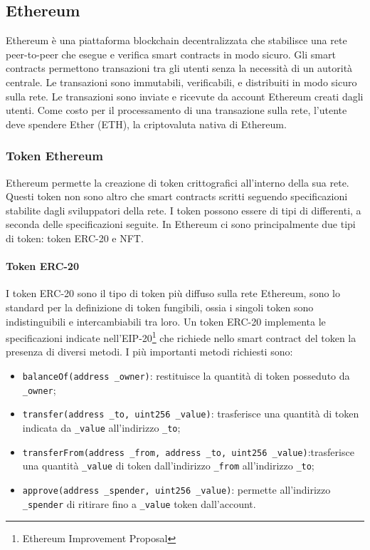 \documentclass[a4paper]{article}
\begin{document}
    \subsection{Ethereum}
    Ethereum è una piattaforma blockchain decentralizzata che stabilisce una rete peer-to-peer che esegue e verifica smart contracts in modo sicuro.
    Gli smart contracts permettono transazioni tra gli utenti senza la necessità di un autorità centrale.
    Le transazioni sono immutabili, verificabili, e distribuiti in modo sicuro sulla rete. Le transazioni sono inviate e ricevute da account Ethereum creati dagli utenti.
    Come costo per il processamento di una transazione sulla rete, l'utente deve spendere Ether (ETH), la criptovaluta nativa di Ethereum\cite{ethereum}.
    \subsubsection{Token Ethereum}
    Ethereum permette la creazione di token crittografici all'interno della sua rete. Questi token non sono altro che smart contracts scritti seguendo specificazioni stabilite
    dagli sviluppatori della rete. I token possono essere di tipi di differenti, a seconda delle specificazioni seguite. In Ethereum ci sono principalmente due tipi di token: token ERC-20 e NFT.
    \paragraph{Token ERC-20}
    I token ERC-20 sono il tipo di token più diffuso sulla rete Ethereum, sono lo standard per la definizione di token fungibili\cite{erc20}, ossia i singoli token sono indistinguibili e intercambiabili tra loro.
    Un token ERC-20 implementa le specificazioni indicate nell'EIP-20\footnote{Ethereum Improvement Proposal} che richiede nello smart contract del token la presenza di diversi metodi. I più importanti metodi richiesti sono:
    \begin{itemize}
      \item \verb|balanceOf(address _owner)|: restituisce la quantità di token posseduto da \verb|_owner|;
      \item \verb|transfer(address _to, uint256 _value)|: trasferisce una quantità di token indicata da \verb|_value| all'indirizzo \verb|_to|;
      \item \verb|transferFrom(address _from, address _to, uint256 _value)|:\newline trasferisce una quantità \verb|_value| di token dall'indirizzo \verb|_from| all'indirizzo \verb|_to|;
      \item \verb|approve(address _spender, uint256 _value)|: permette all'indirizzo \verb|_spender| di ritirare fino a \verb|_value| token dall'account\cite{eip20}.
    \end{itemize}
\end{document}
